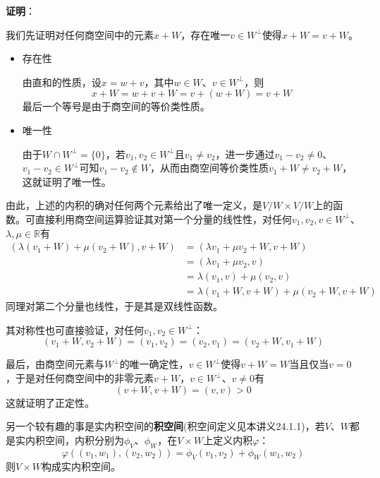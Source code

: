 \documentclass[a4paper,UTF8,fontset=windows,AutoFakeBold]{ctexart}
\newcommand{\proo}[1]{{\vspace{5pt}\kaishu\noindent\textbf{证明}：\vspace{-3pt}
\begin{compactitem}
    \item[] #1
\end{compactitem}
}}
\begin{document}
\proo{
    我们先证明对任何商空间中的元素$x+W$，存在唯一$v\in W^\bot$使得$x+W=v+W$。
    \begin{itemize}
        \item 存在性
        
        由直和的性质，设$x=w+v$，其中$w\in W$、$v\in W^\bot$，则
        $$x+W=w+v+W=v+(w+W)=v+W$$
        最后一个等号是由于商空间的等价类性质。

        \item 唯一性
        
        由于$W\cap W^\bot=\{0\}$，若$v_1,v_2\in W^\bot$且$v_1\ne v_2$，进一步通过$v_1-v_2\ne0$、$v_1-v_2\in W^\bot$可知$v_1-v_2\notin W$，从而由商空间等价类性质$v_1+W\ne v_2+W$，这就证明了唯一性。
    \end{itemize}

    由此，上述的内积的确对任何两个元素给出了唯一定义，是$V/W\times V/W$上的函数。可直接利用商空间运算验证其对第一个分量的线性性，对任何$v_1,v_2,v\in W^\bot$、$\lambda,\mu\in\mathbb{R}$有
    $$\begin{aligned}(\lambda(v_1+W)+\mu(v_2+W),v+W)&=(\lambda v_1+\mu v_2+W,v+W)\\ &=(\lambda v_1+\mu v_2,v)\\ &=\lambda(v_1,v)+\mu(v_2,v)\\ &=\lambda(v_1+W,v+W)+\mu(v_2+W,v+W)\end{aligned}$$
    同理对第二个分量也线性，于是其是双线性函数。

    其对称性也可直接验证，对任何$v_1,v_2\in W^\bot$：
    $$(v_1+W,v_2+W)=(v_1,v_2)=(v_2,v_1)=(v_2+W,v_1+W)$$
    
    最后，由商空间元素与$W^\bot$的唯一确定性，$v\in W^\bot$使得$v+W=W$当且仅当$v=0$，于是对任何商空间中的非零元素$v+W$，$v\in W^\bot$、$v\ne0$有
    $$(v+W,v+W)=(v,v)>0$$
    这就证明了正定性。
}

另一个较有趣的事是实内积空间的\textbf{积空间}(积空间定义见本讲义24.1.1)，若$V$、$W$都是实内积空间，内积分别为$\phi_V$、$\phi_W$，在$V\times W$上定义内积$\varphi$：
$$\varphi((v_1,w_1),(v_2,w_2))=\phi_V(v_1,v_2)+\phi_W(w_1,w_2)$$
则$V\times W$构成实内积空间。
\end{document}
